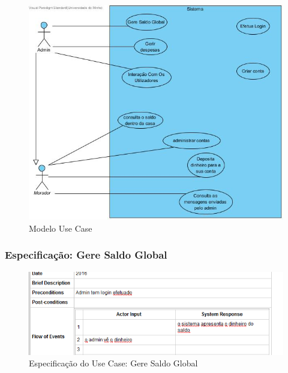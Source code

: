 \begin{figure}[htb!]
	\centering
	\includegraphics[scale=0.5]{imagens/useCase/UseCase}  
	\caption{Modelo Use Case}  
\end{figure}

\newpage
\subsubsection{Especificação: Gere Saldo Global }

\begin{figure}[htb!]
	\centering
	\includegraphics[scale=0.6]{imagens/Especificacoes/geresaldoglobal}  
	\caption{Especificação do Use Case: Gere Saldo Global  }  
\end{figure}

